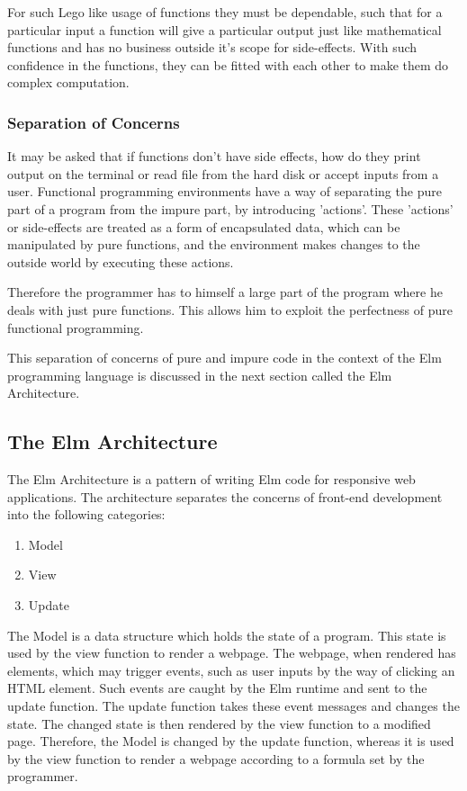 For such Lego like usage of functions they must be dependable, such that for a
particular input a function will give a particular output just like
mathematical functions and has no business outside it's scope for side-effects.
With such confidence in the functions, they can be fitted with each other to
make them do complex computation.

\subsubsection{Separation of Concerns}
It may be asked that if functions don't have side effects, how do they print
output on the terminal or read file from the hard disk or accept inputs from a
user. Functional programming environments have a way of separating the pure
part of a program from the impure part, by introducing 'actions'. These
'actions' or side-effects are treated as a form of encapsulated data, which
can be manipulated by pure functions, and the environment makes changes to the
outside world by executing these actions.

Therefore the programmer has to himself a large part of the program where he
deals with just pure functions. This allows him to exploit the perfectness of
pure functional programming.

This separation of concerns of pure and impure code in the context of the Elm
programming language is discussed in the next section called the Elm
Architecture.

\subsection{The Elm Architecture}
The Elm Architecture is a pattern of writing Elm code for responsive web applications. 
The architecture separates the concerns of front-end development into the following categories:

\begin{enumerate}
\item Model
\item View
\item Update
\end{enumerate}

The Model is a data structure which holds the state of a program. This state is
used by the view function to render a webpage. The webpage, when rendered has
elements, which may trigger events, such as user inputs by the way of clicking
an HTML element. Such events are caught by the Elm runtime and sent to the update
function.  The update function takes these event messages and changes the
state. The changed state is then rendered by the view function to a modified
page.  Therefore, the Model is changed by the update function, whereas it is
used by the view function to render a webpage according to a formula set by the
programmer.

